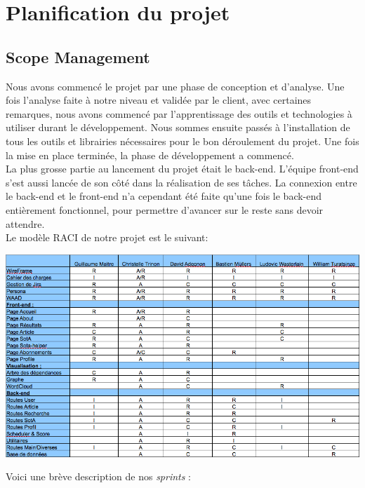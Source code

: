 \documentclass[t, 12pt, usenames,dvipsnames]{article}
\begin{document}
    
    
    \newpage
    
    \section{Planification du projet}
        \subsection{Scope Management}
        \noindent Nous avons commencé le projet par une phase de conception et d'analyse. Une fois l'analyse faite à notre niveau et validée par le client, avec certaines remarques, nous avons commencé par l'apprentissage des outils et technologies à utiliser durant le développement. Nous sommes ensuite passés à l'installation de tous les outils et librairies nécessaires pour le bon déroulement du projet. Une fois la mise en place terminée, la phase de développement a commencé.\\
        La plus grosse partie au lancement du projet était le back-end. L'équipe front-end s'est aussi lancée de son côté dans la réalisation de ses tâches. La connexion entre le back-end et le front-end n'a cependant été faite qu'une fois le back-end entièrement fonctionnel, pour permettre d'avancer sur le reste sans devoir attendre.\\
        Le modèle RACI de notre projet est le suivant:
        \begin{center}
            \includegraphics[scale=.5]{images/RACI.png}
            \label{fig:modele_raci}
        \end{center}
                
        \noindent Voici une brève description de nos \textit{sprints} : 
\end{document}
